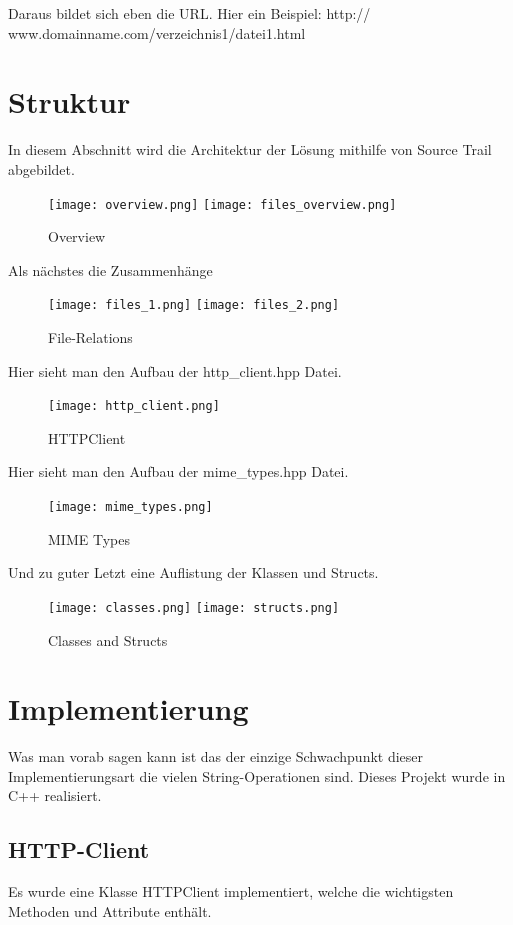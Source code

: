 \documentclass{article}
\begin{document}
\noindent Daraus bildet sich eben die URL.
Hier ein Beispiel: \newline
http:// www.domainname.com/verzeichnis1/datei1.html
\newpage
\section{Struktur}
In diesem Abschnitt wird die Architektur der Lösung mithilfe von Source Trail \cite{sourcetrail} abgebildet.

\begin{figure}[h!]
\centering
\texttt{[image: overview.png]}
\texttt{[image: files\_overview.png]}
\caption{Overview}
\label{fig:overview}
\end{figure}
\newpage
\noindent Als nächstes die Zusammenhänge

\begin{figure}[h!]
\centering
\texttt{[image: files\_1.png]}
\texttt{[image: files\_2.png]}
\caption{File-Relations}
\label{fig:filerelations}
\end{figure}

\newpage
\noindent Hier sieht man den Aufbau der http\_client.hpp Datei.
\begin{figure}[h!]
\centering
\texttt{[image: http\_client.png]}
\caption{HTTPClient}
\label{fig:http_client.hpp}
\end{figure}

\newpage
\noindent Hier sieht man den Aufbau der mime\_types.hpp Datei.
\begin{figure}[h!]
\centering
\texttt{[image: mime\_types.png]}
\caption{MIME Types}
\label{fig:mime_types.hpp}
\end{figure}

\noindent Und zu guter Letzt eine Auflistung der Klassen und Structs.
\begin{figure}[h!]
\centering
\texttt{[image: classes.png]}
\texttt{[image: structs.png]}
\caption{Classes and Structs}
\label{fig:classandstruct}
\end{figure}

\section{Implementierung}
Was man vorab sagen kann ist das der einzige Schwachpunkt dieser Implementierungsart die vielen String-Operationen sind. \newline 
\noindent Dieses Projekt wurde in C++ realisiert.

\subsection{HTTP-Client}
Es wurde eine Klasse HTTPClient implementiert, welche die wichtigsten Methoden und Attribute enthält.
\end{document}
